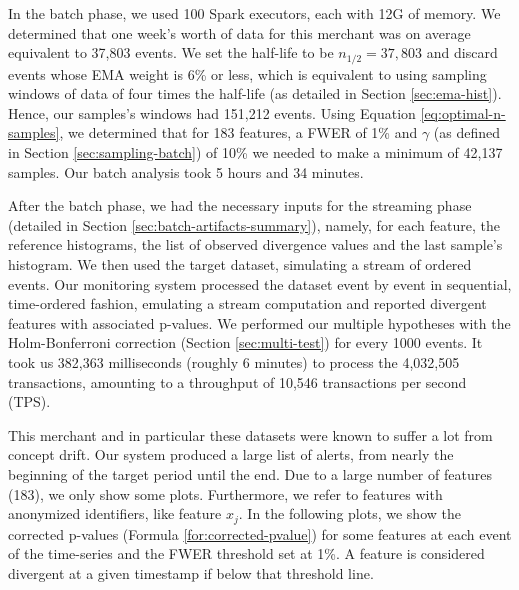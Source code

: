 \documentclass[sigconf]{acmart}
\begin{document}
In the batch phase, we used 100 Spark executors, each with 12G of memory. We determined that one week's worth of data for this merchant was on average equivalent to 37,803 events. We set the half-life to be $n_{1/2}=37,803$ and discard events whose EMA weight is 6\% or less, which is equivalent to using sampling windows of data of four times the half-life (as detailed in Section \ref{sec:ema-hist}). Hence, our samples's windows had 151,212 events. Using Equation \ref{eq:optimal-n-samples}, we determined that for 183 features, a FWER of 1\% and $\gamma$ (as defined in Section \ref{sec:sampling-batch}) of 10\% we needed to make a minimum of 42,137 samples. Our batch analysis took 5 hours and 34 minutes.

After the batch phase, we had the necessary inputs for the streaming phase (detailed in Section \ref{sec:batch-artifacts-summary}), namely, for each feature, the reference histograms, the list of observed divergence values and the last sample's histogram. We then used the target dataset, simulating a stream of ordered events. Our monitoring system processed the dataset event by event in sequential, time-ordered fashion, emulating a stream computation and reported divergent features with associated p-values. We performed our multiple hypotheses with the Holm-Bonferroni correction (Section \ref{sec:multi-test}) for every 1000 events. It took us 382,363 milliseconds (roughly 6 minutes) to process the 4,032,505 transactions, amounting to a throughput of 10,546 transactions per second (TPS).

This merchant and in particular these datasets were known to suffer a lot from concept drift. Our system produced a large list of alerts, from nearly the beginning of the target period until the end. Due to a large number of features (183), we only show some plots. Furthermore, we refer to features with anonymized identifiers, like feature $x_j$. In the following plots, we show the corrected p-values (Formula \ref{for:corrected-pvalue}) for some features at each event of the time-series and the FWER threshold set at 1\%. A feature is considered divergent at a given timestamp if below that threshold line.
\end{document}
